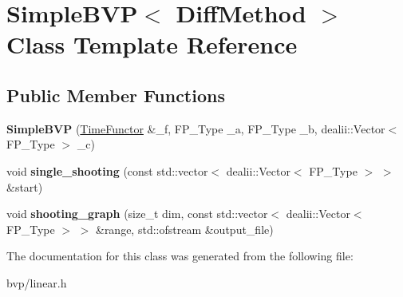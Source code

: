 \hypertarget{classSimpleBVP}{}\section{Simple\+B\+VP$<$ Diff\+Method $>$ Class Template Reference}
\label{classSimpleBVP}
\subsection*{Public Member Functions}
\begin{DoxyCompactItemize}
\item 
\mbox{\label{classSimpleBVP_a4e0d2aec5b55b5bb68938361d58459cc}} 
{\bfseries Simple\+B\+VP} (\hyperlink{classTimeFunctor}{Time\+Functor} \&\+\_\+f, F\+P\+\_\+\+Type \+\_\+a, F\+P\+\_\+\+Type \+\_\+b, dealii\+::\+Vector$<$ F\+P\+\_\+\+Type $>$ \+\_\+c)
\item 
\mbox{\label{classSimpleBVP_a7a82615c678f4f57648788b2d788d32e}} 
void {\bfseries single\+\_\+shooting} (const std\+::vector$<$ dealii\+::\+Vector$<$ F\+P\+\_\+\+Type $>$ $>$ \&start)
\item 
\mbox{\label{classSimpleBVP_a36f55e9851a3858cf8133ec8391527fc}} 
void {\bfseries shooting\+\_\+graph} (size\+\_\+t dim, const std\+::vector$<$ dealii\+::\+Vector$<$ F\+P\+\_\+\+Type $>$ $>$ \&range, std\+::ofstream \&output\+\_\+file)
\end{DoxyCompactItemize}


The documentation for this class was generated from the following file\+:\begin{DoxyCompactItemize}
\item 
bvp/linear.\+h\end{DoxyCompactItemize}

